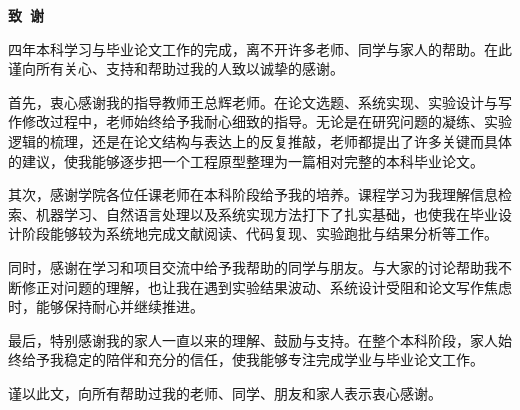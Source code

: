 \cleardoublepage{}
\begin{center}
    \bfseries {} 致~谢
\end{center}

四年本科学习与毕业论文工作的完成，离不开许多老师、同学与家人的帮助。在此谨向所有关心、支持和帮助过我的人致以诚挚的感谢。

首先，衷心感谢我的指导教师王总辉老师。在论文选题、系统实现、实验设计与写作修改过程中，老师始终给予我耐心细致的指导。无论是在研究问题的凝练、实验逻辑的梳理，还是在论文结构与表达上的反复推敲，老师都提出了许多关键而具体的建议，使我能够逐步把一个工程原型整理为一篇相对完整的本科毕业论文。

其次，感谢学院各位任课老师在本科阶段给予我的培养。课程学习为我理解信息检索、机器学习、自然语言处理以及系统实现方法打下了扎实基础，也使我在毕业设计阶段能够较为系统地完成文献阅读、代码复现、实验跑批与结果分析等工作。

同时，感谢在学习和项目交流中给予我帮助的同学与朋友。与大家的讨论帮助我不断修正对问题的理解，也让我在遇到实验结果波动、系统设计受阻和论文写作焦虑时，能够保持耐心并继续推进。

最后，特别感谢我的家人一直以来的理解、鼓励与支持。在整个本科阶段，家人始终给予我稳定的陪伴和充分的信任，使我能够专注完成学业与毕业论文工作。

谨以此文，向所有帮助过我的老师、同学、朋友和家人表示衷心感谢。
